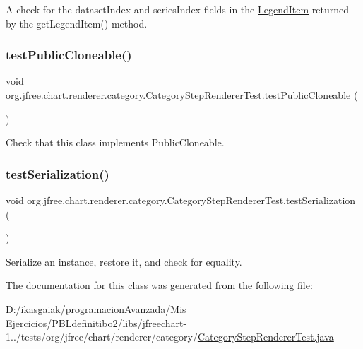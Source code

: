 A check for the dataset\+Index and series\+Index fields in the \mbox{\hyperlink{classorg_1_1jfree_1_1chart_1_1_legend_item}{Legend\+Item}} returned by the get\+Legend\+Item() method. \mbox{\label{classorg_1_1jfree_1_1chart_1_1renderer_1_1category_1_1_category_step_renderer_test_a0fa9137fbb22ee05c4a8329c52ebb016}} 
\subsubsection{\texorpdfstring{test\+Public\+Cloneable()}{testPublicCloneable()}}
{\footnotesize\ttfamily void org.\+jfree.\+chart.\+renderer.\+category.\+Category\+Step\+Renderer\+Test.\+test\+Public\+Cloneable (\begin{DoxyParamCaption}{ }\end{DoxyParamCaption})}

Check that this class implements Public\+Cloneable. \mbox{\label{classorg_1_1jfree_1_1chart_1_1renderer_1_1category_1_1_category_step_renderer_test_a40b32b992dffaa879ccb9d14fb0c72c1}} 
\subsubsection{\texorpdfstring{test\+Serialization()}{testSerialization()}}
{\footnotesize\ttfamily void org.\+jfree.\+chart.\+renderer.\+category.\+Category\+Step\+Renderer\+Test.\+test\+Serialization (\begin{DoxyParamCaption}{ }\end{DoxyParamCaption})}

Serialize an instance, restore it, and check for equality. 

The documentation for this class was generated from the following file\+:\begin{DoxyCompactItemize}
\item 
D\+:/ikasgaiak/programacion\+Avanzada/\+Mis Ejercicios/\+P\+B\+Ldefinitibo2/libs/jfreechart-\/1../tests/org/jfree/chart/renderer/category/\mbox{\hyperlink{_category_step_renderer_test_8java}{Category\+Step\+Renderer\+Test.\+java}}\end{DoxyCompactItemize}
